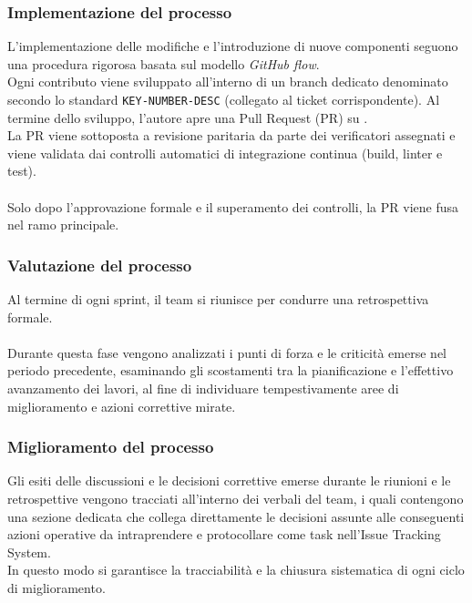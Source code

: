 \subsubsection{Implementazione del processo}
L'implementazione delle modifiche e l'introduzione di nuove componenti seguono una procedura rigorosa basata sul modello \emph{GitHub flow}.\\
Ogni contributo viene sviluppato all'interno di un branch dedicato denominato secondo lo standard \texttt{KEY-NUMBER-DESC} (collegato al ticket  corrispondente). Al termine dello sviluppo, l'autore apre una Pull Request (PR) su . \\
La PR viene sottoposta a revisione paritaria da parte dei verificatori assegnati e viene validata dai controlli automatici di integrazione continua (build, linter e test).\\
\\
Solo dopo l'approvazione formale e il superamento dei controlli, la PR viene fusa nel ramo principale. 

\subsubsection{Valutazione del processo}
Al termine di ogni sprint, il team si riunisce per condurre una retrospettiva formale. \\
\\
Durante questa fase vengono analizzati i punti di forza e le criticità emerse nel periodo precedente, esaminando gli scostamenti tra la pianificazione e l'effettivo avanzamento dei lavori, al fine di individuare tempestivamente aree di miglioramento e azioni correttive mirate.

\subsubsection{Miglioramento del processo}
Gli esiti delle discussioni e le decisioni correttive emerse durante le riunioni e le retrospettive vengono tracciati all'interno dei verbali del team, i quali contengono una sezione dedicata che collega direttamente le decisioni assunte alle conseguenti azioni operative da intraprendere e protocollare come task nell'Issue Tracking System.\\
In questo modo si garantisce la tracciabilità e la chiusura sistematica di ogni ciclo di miglioramento.
